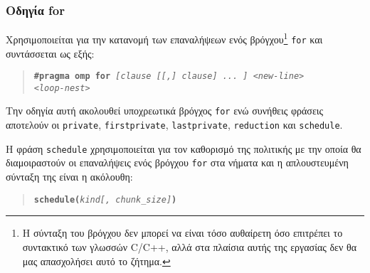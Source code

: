 \subsubsection{Οδηγία for}
Χρησιμοποιείται για την κατανομή των επαναλήψεων ενός βρόγχου\footnote{Η σύνταξη του βρόγχου δεν μπορεί να είναι τόσο αυθαίρετη όσο επιτρέπει το συντακτικό των γλωσσών C/C++, αλλά στα πλαίσια αυτής της εργασίας δεν θα μας απασχολήσει αυτό το ζήτημα.} \texttt{for} και συντάσσεται ως εξής:
\begin{quote}
	\texttt{\textbf{\#pragma omp for} \textit{[clause [[,] clause] ... ] <new-line>}} \\
		\texttt{\textit{<loop-nest>}}
\end{quote}

Την οδηγία αυτή ακολουθεί υποχρεωτικά βρόγχος \texttt{for} ενώ συνήθεις φράσεις αποτελούν οι \texttt{private}, \texttt{firstprivate}, \texttt{lastprivate}, \texttt{reduction} και \texttt{schedule}.

Η φράση \texttt{schedule} χρησιμοποιείται για τον καθορισμό της πολιτικής με την οποία θα διαμοιραστούν οι επαναλήψεις ενός βρόγχου \texttt{for} στα νήματα και η απλουστευμένη σύνταξη της είναι η ακόλουθη:
\begin{quote}
	\texttt{\textbf{schedule(}\textit{kind[, chunk\_size]}\textbf{)}}
\end{quote}

